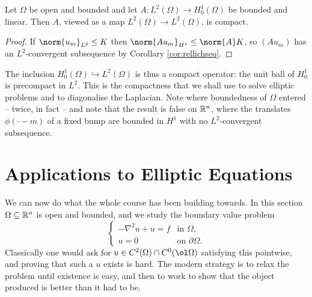 \documentclass[a4paper]{scrartcl}
\begin{document}
\begin{corollary}\label{cor:compactop}
	Let $\Omega$ be open and bounded and let $A : L^2(\Omega)\to H_0^1(\Omega)$ be bounded and linear. Then $A$, viewed as a map $L^2(\Omega)\to L^2(\Omega)$, is compact.
\end{corollary}

\begin{proof}
	If $\norm{u_m}_{L^2}\le K$ then $\norm{Au_m}_{H^1}\le\norm{A}K$, so $(Au_m)$ has an $L^2$-convergent subsequence by Corollary \ref{cor:rellichseq}.
\end{proof}

The inclusion $H_0^1(\Omega)\hookrightarrow L^2(\Omega)$ is thus a compact operator: the unit ball of $H_0^1$ is precompact in $L^2$. This is the compactness that we shall use to solve elliptic problems and to diagonalise the Laplacian. Note where boundedness of $\Omega$ entered -- twice, in fact -- and note that the result is false on $\mathbb{R}^n$, where the translates $\phi(\cdot - m)$ of a fixed bump are bounded in $H^1$ with no $L^2$-convergent subsequence.

\section{Applications to Elliptic Equations}\label{sec:pde}

We can now do what the whole course has been building towards. In this section $\Omega\subseteq\mathbb{R}^n$ is open and bounded, and we study the boundary value problem
$$\begin{cases} -\nabla^2u+u=f & \text{in }\Omega,\\ u = 0 & \text{on }\partial\Omega.\end{cases}$$
Classically one would ask for $u \in C^2(\Omega)\cap C^0(\ol\Omega)$ satisfying this pointwise, and proving that such a $u$ exists is hard. The modern strategy is to relax the problem until existence is easy, and then to work to show that the object produced is better than it had to be.

\begin{center}
\end{center}
\end{document}
